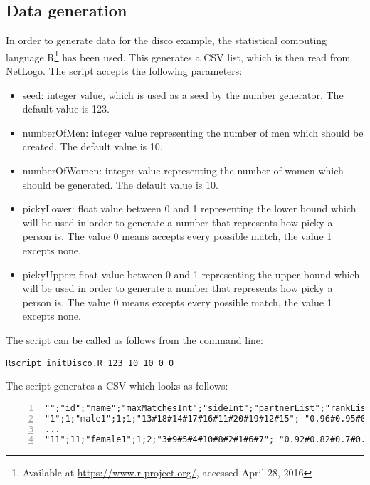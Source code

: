 \subsection{Data generation}
In order to generate data for the disco example, the statistical computing language R\footnote{Available at \url{https://www.r-project.org/}, accessed April 28, 2016} has been used. 
This generates a CSV list, which is then read from NetLogo. 
The script accepts the following parameters:
\begin{itemize}
	\item seed: integer value, which is used as a seed by the number generator. The default value is 123.
	\item numberOfMen: integer value representing the number of men which should be created. The default value is 10.
	\item numberOfWomen: integer value representing the number of women which should be generated. The default value is 10.
	\item pickyLower: float value between 0 and 1 representing the lower bound which will be used in order to generate a number that represents how picky a person is. The value 0 means accepts every possible match, the value 1 excepts none.
	\item pickyUpper: float value between 0 and 1 representing the upper bound which will be used in order to generate a number that represents how picky a person is. The value 0 means excepts every possible match, the value 1 excepts none.
\end{itemize}

The script can be called as follows from the command line: 
\begin{verbatim}
Rscript initDisco.R 123 10 10 0 0
\end{verbatim}

The script generates a CSV which looks as follows:
\begin{lstlisting}[numbers=left, breaklines=true] 
"";"id";"name";"maxMatchesInt";"sideInt";"partnerList";"rankList"
"1";1;"male1";1;1;"13#18#14#17#16#11#20#19#12#15"; "0.96#0.95#0.9#0.68#0.57#0.45#0.33#0.25#0.1#0.04"
...
"11";11;"female1";1;2;"3#9#5#4#10#8#2#1#6#7"; "0.92#0.82#0.7#0.67#0.48#0.41#0.35#0.25#0.22#0.05"
\end{lstlisting}

